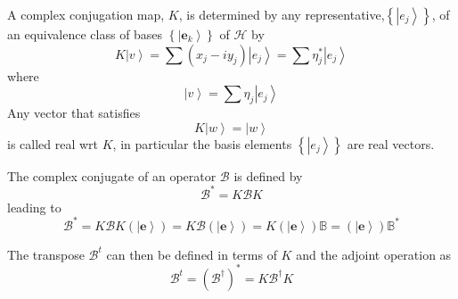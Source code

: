 \documentclass[aps,preprint]{revtex4}%
\begin{document}
A complex conjugation map, $K$, is determined by any representative,$\left\{
\left\vert e_{j}\right\rangle \right\}  $, of an equivalence class of bases
$\left\{  \left\vert \mathbf{e}_{k}\right\rangle \right\}  $ of $\mathcal{H}$
by
\begin{equation}
K\left\vert v\right\rangle =%
{\displaystyle\sum}
\left(  x_{j}-iy_{j}\right)  \left\vert e_{j}\right\rangle =%
{\displaystyle\sum}
\eta_{j}^{\ast}\left\vert e_{j}\right\rangle
\end{equation}
where
\begin{equation}
\left\vert v\right\rangle =%
{\displaystyle\sum}
\eta_{j}\left\vert e_{j}\right\rangle
\end{equation}
Any vector that satisfies
\begin{equation}
K\left\vert w\right\rangle =\left\vert w\right\rangle
\end{equation}
is called real wrt $K$, in particular the basis elements $\left\{  \left\vert
e_{j}\right\rangle \right\}  $ are real vectors.

The complex conjugate of an operator $\mathcal{B}$ is defined by
\begin{equation}
\mathcal{B}^{\ast}=K\mathcal{B}K
\end{equation}
leading to
\begin{equation}
\mathcal{B}^{\ast}=K\mathcal{B}K\left(  \left\vert \mathbf{e}\right\rangle
\right)  =K\mathcal{B}\left(  \left\vert \mathbf{e}\right\rangle \right)
=K\left(  \left\vert \mathbf{e}\right\rangle \right)  \mathbb{B}=\left(
\left\vert \mathbf{e}\right\rangle \right)  \mathbb{B}^{\ast}%
\end{equation}


The transpose $\mathcal{B}^{t}$ can then be defined in terms of $K$ and the
adjoint operation as
\begin{equation}
\mathcal{B}^{t}=\left(  \mathcal{B}^{\dagger}\right)  ^{\ast}=K\mathcal{B}%
^{\dagger}K
\end{equation}
\end{document}
